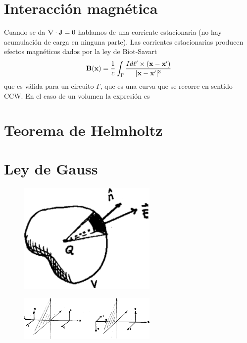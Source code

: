 \documentclass[10pt,oneside]{CBFT_book}
\begin{document}
\section{Interacción magnética}

Cuando se da $\nabla \cdot \vb{J}=0$ hablamos de una corriente estacionaria (no hay acumulación de carga en
ninguna parte). Las corrientes estacionarias producen efectos magnéticos dados por la ley de Biot-Savart
\[
	\vb{B}(\vb{x}) = \frac{1}{c} \int_\Gamma \frac{I d\vb{\ell}' \times (\vb{x} - \vb{x}')}{|\vb{x} - \vb{x}'|^3} 
\]
que es válida para un circuito $\Gamma$, que es una curva que se recorre en sentido CCW.
En el caso de un volumen la expresión es


\section{Teorema de Helmholtz}


\section{Ley de Gauss}

\begin{figure}[htb]
	\begin{center}
	\includegraphics[width=0.6\textwidth]{images/fig_ft1_gauss.pdf}	 
	\end{center}
	\caption{}
\end{figure} 


\begin{figure}[htb]
	\begin{center}
	\includegraphics[width=0.6\textwidth]{images/fig_ft1_reflexvect.pdf}	 
	\end{center}
	\caption{}
\end{figure} 

\end{document}
